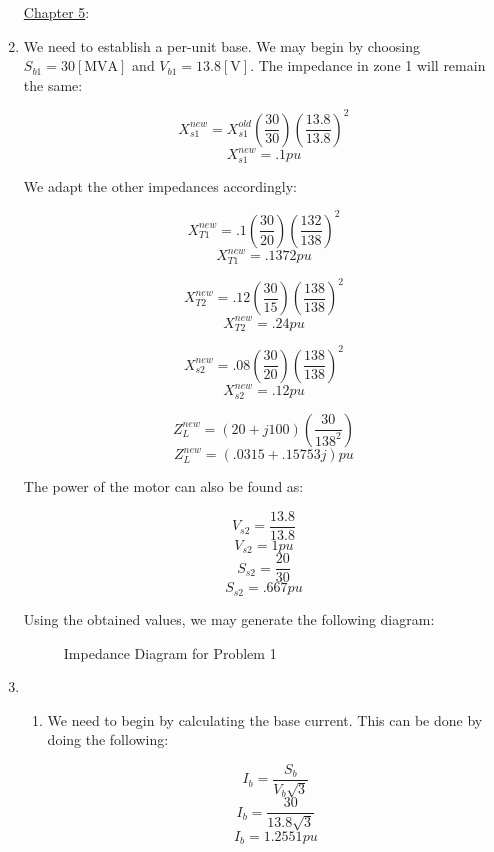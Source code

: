 \begin{enumerate}

    \begin{center}
      \underline{Chapter 5}:
    \end{center}

    \setcounter{enumi}{14}

  \item We need to establish a per-unit base. We may begin by choosing $S_{b1}=30[\si{\mega\volt\ampere}]$ and $V_{b1}=13.8[\si{\volt}]$. The impedance in zone 1 will remain the same:

    $$X_{s1}^{new}=X_{s1}^{old}\left( \frac{30}{30} \right)\left( \frac{13.8}{13.8} \right)^2$$
    $$X_{s1}^{new}=.1pu$$

    We adapt the other impedances accordingly:

    $$X_{T1}^{new}=.1\left( \frac{30}{20} \right)\left( \frac{132}{138} \right)^2$$
    $$X_{T1}^{new}=.1372pu$$

    $$X_{T2}^{new}=.12\left( \frac{30}{15} \right)\left( \frac{138}{138} \right)^2$$
    $$X_{T2}^{new}=.24pu$$

    $$X_{s2}^{new}=.08\left( \frac{30}{20} \right)\left( \frac{138}{138} \right)^2$$
    $$X_{s2}^{new}=.12pu$$

    $$Z_{L}^{new}=(20+j100)\left( \frac{30}{138^2} \right)$$
    $$Z_{L}^{new}=(.0315+.15753j)pu$$

    The power of the motor can also be found as:

    $$V_{s2}=\frac{13.8}{13.8}$$
    $$V_{s2}=1pu$$
    $$S_{s2}=\frac{20}{30}$$
    $$S_{s2}=.667pu$$
    
    Using the obtained values, we may generate the following diagram:

    \begin{figure}[H]
      \centering
      
      \caption{Impedance Diagram for Problem 1}
      \label{fig:1}
    \end{figure}

  \item

    \begin{enumerate}

      \item 

        We need to begin by calculating the base current. This can be done by doing the following:

        $$I_b=\frac{S_b}{V_b\sqrt{3}}$$
        $$I_b=\frac{30}{13.8\sqrt{3}}$$
        $$I_b=1.2551pu$$


\end{enumerate}
\end{enumerate}
